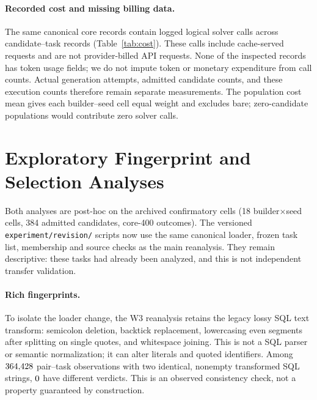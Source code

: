 \begin{table}[t]
\centering\small

\caption{Corrected sensitivities on core-400, 18 cells. CIs are unadjusted.
K-matched comparisons always retain bare; R2 comparisons exclude bare and
are conditional on the observed acquisition groups.}
\label{tab:sensitivity}
\end{table}

\paragraph{Recorded cost and missing billing data.}
The same canonical core records contain \RevisionLogicalCalls{} logged
logical solver calls across \RevisionCostRows{} candidate--task records
(Table~\ref{tab:cost}). These calls include cache-served requests and are
not provider-billed API requests. None of the inspected records has token
usage fields; we do not impute token or monetary expenditure from call
counts. Actual generation attempts, admitted candidate counts, and these
execution counts therefore remain separate measurements. The population
cost mean gives each builder--seed cell equal weight and excludes bare;
zero-candidate populations would contribute zero solver calls.

\begin{table}[t]
\centering\small

\caption{Descriptive canonical cost audit on core-400, 18 cells per arm.
Logged logical calls are not billable requests or token counts. The last
column averages candidate-population calls per task over cells.}
\label{tab:cost}
\end{table}

\section{Exploratory Fingerprint and Selection Analyses}\label{app:rich}
Both analyses are post-hoc on the archived confirmatory cells (18
builder$\times$seed cells, 384 admitted candidates, core-400 outcomes).
The versioned \texttt{experiment/revision/} scripts now use the same
canonical loader, frozen task list, membership and source checks as the
main reanalysis. They remain descriptive: these tasks had already been
analyzed, and this is not independent transfer validation.

\paragraph{Rich fingerprints.} To isolate the loader change, the W3
reanalysis retains the legacy lossy SQL text transform: semicolon deletion,
backtick replacement, lowercasing even segments after splitting on single
quotes, and whitespace joining. This is not a SQL parser or semantic
normalization; it can alter literals and quoted identifiers. Among
$364{,}428$ pair--task observations with two identical,
nonempty transformed SQL strings, $0$
have different verdicts. This is an observed consistency check, not a
property guaranteed by construction.

